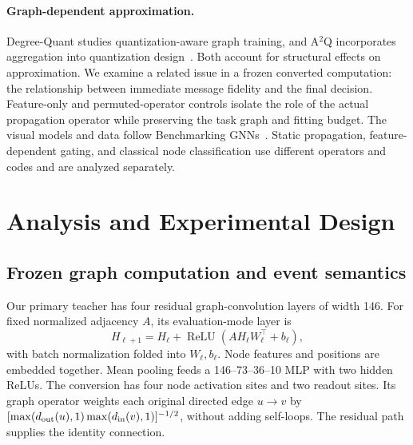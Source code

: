 \documentclass[10pt,twocolumn,letterpaper]{article}
\begin{document}
\paragraph{Graph-dependent approximation.}
Degree-Quant studies quantization-aware graph training, and A$^2$Q incorporates aggregation into quantization design~\cite{degreequant2021,a2q2023}. Both account for structural effects on approximation. We examine a related issue in a frozen converted computation: the relationship between immediate message fidelity and the final decision. Feature-only and permuted-operator controls isolate the role of the actual propagation operator while preserving the task graph and fitting budget. The visual models and data follow Benchmarking GNNs~\cite{dwivedi2023}. Static propagation, feature-dependent gating, and classical node classification use different operators and codes and are analyzed separately.

\section{Analysis and Experimental Design}
\subsection{Frozen graph computation and event semantics}
Our primary teacher has four residual graph-convolution layers of width 146. For fixed normalized adjacency $A$, its evaluation-mode layer is
\begin{equation}
 H_{\ell+1}=H_\ell+\operatorname{ReLU}(AH_\ell W_\ell^\top+b_\ell),
 \label{eq:block}
\end{equation}
with batch normalization folded into $W_\ell,b_\ell$. Node features and positions are embedded together. Mean pooling feeds a 146--73--36--10 MLP with two hidden ReLUs. The conversion has four node activation sites and two readout sites. Its graph operator weights each original directed edge $u\!\to\!v$ by $[\max(d_{\rm out}(u),1)\max(d_{\rm in}(v),1)]^{-1/2}$, without adding self-loops. The residual path supplies the identity connection.
\end{document}
